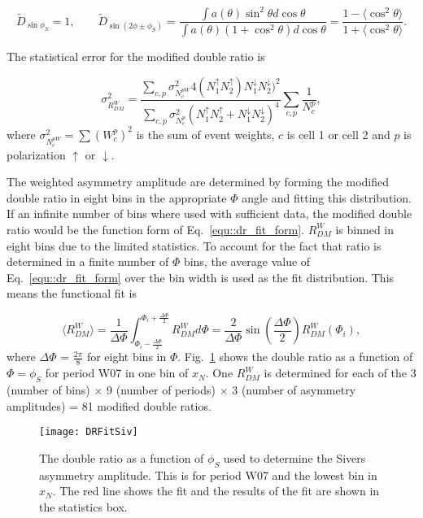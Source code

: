 \begin{equation}
  \tilde{D}_{\sin\phi_S} = 1, \quad\quad \tilde{D}_{\sin(2\phi\pm\phi_S)} =
  \frac{\int a(\theta)\sin^2\theta d\cos\theta} {\int a(\theta)(1+\cos^2\theta)
    d\cos\theta} = \frac{1-\langle \cos^2\theta\rangle} {1+\langle
    \cos^2\theta\rangle}.
\end{equation}

The statistical error for the modified double ratio is

\begin{equation}
  \sigma^2_{R^W_{DM}} = \frac{\sum_{c,p} \sigma^2_{N_c^{pW}}
    4(N^{\uparrow}_1N^{\uparrow}_2)N^{\downarrow}_1N^{\downarrow}_2)^2}
        {\sum_{c,p} \sigma^2_{N_c^{p}}
          (N^{\uparrow}_1N^{\uparrow}_2 + N^{\downarrow}_1N^{\downarrow}_2)^4}
        \sum_{c,p}\frac{1}{N_c^p},
\end{equation}
\noindent
where $\sigma^2_{N_c^{pW}} = \sum (W^p_c)^2$ is the sum of event weights, $c$ is
cell 1 or cell 2 and $p$ is polarization $\uparrow$ or $\downarrow$.

The weighted asymmetry amplitude are determined by forming the modified double
ratio in eight bins in the appropriate $\Phi$ angle and fitting this
distribution.  If an infinite number of bins where used with sufficient data,
the modified double ratio would be the function form of
Eq.~\ref{equ::dr_fit_form}.  $R^W_{DM}$ is binned in eight bins due to the
limited statistics.  To account for the fact that ratio is determined in a
finite number of $\Phi$ bins, the average value of Eq.~\ref{equ::dr_fit_form}
over the bin width is used as the fit distribution.  This means the functional
fit is

\begin{equation}
  \langle R^W_{DM} \rangle = \frac{1}{\Delta\Phi}
  \int_{\Phi_i-\frac{\Delta\Phi}{2}}^{\Phi_i+\frac{\Delta\Phi}{2}} R^W_{DM}
  d\Phi = \frac{2}{\Delta\Phi}\sin(\frac{\Delta\Phi}{2})R^W_{DM}(\Phi_i),
\end{equation}
\noindent
where $\Delta\Phi$ = $\frac{2\pi}{8}$ for eight bins in $\Phi$.
Fig.~\ref{fig::DRFitSiv} shows the double ratio as a function of $\Phi=\phi_S$
for period W07 in one bin of $x_N$.  One $R^W_{DM}$ is determined for each of
the 3 (number of bins) $\times$ 9 (number of periods) $\times$ 3 (number of
asymmetry amplitudes) = 81 modified double ratios.

\begin{figure}[h!t]
  \centering \texttt{[image: DRFitSiv]}
  \caption{The double ratio as a function of $\phi_S$ used to determine the
    Sivers asymmetry amplitude.  This is for period W07 and the lowest bin in
    $x_N$.  The red line shows the fit and the results of the fit are shown in
    the statistics box.}
  \label{fig::DRFitSiv}
\end{figure}

